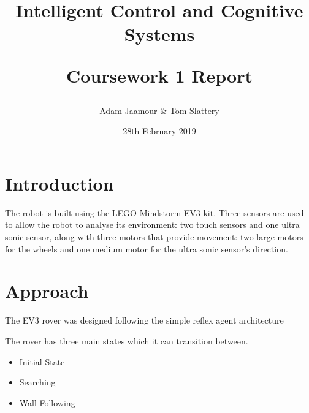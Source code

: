 \documentclass[a4paper,12pt,twocolumn]{article}
\title{
    Intelligent Control and Cognitive Systems\\
    \begin{large}
        Coursework 1 Report
    \end{large}
}
\author{Adam Jaamour & Tom Slattery}
\date{28th February 2019}
\begin{document}
\maketitle
\thispagestyle{empty}
\clearpage
\setcounter{page}{1}


\section{Introduction}

The robot is built using the LEGO Mindstorm EV3 kit. Three sensors are used to allow the robot to analyse its environment: two touch sensors and one ultra sonic sensor, along with three motors that provide movement: two large motors for the wheels and one medium motor for the ultra sonic sensor's direction.

\section{Approach}
The EV3 rover was designed following the simple reflex agent architecture  \cite{brooks1991intelligence}

The rover has three main states which it can transition between.
\begin{itemize}
    \item Initial State
    \item Searching
    \item Wall Following
\end{itemize}
    
\end{document}
